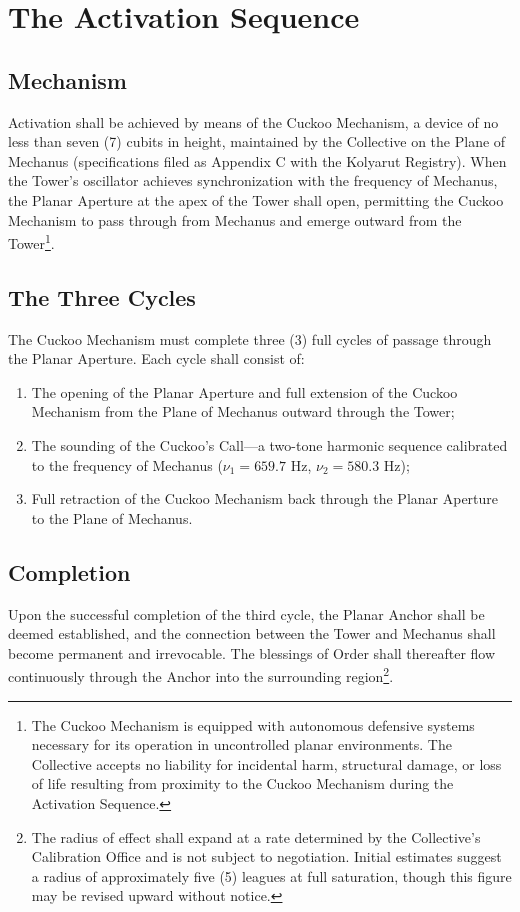\documentclass[12pt]{article}
\begin{document}
\section{The Activation Sequence}

\subsection{Mechanism}
Activation shall be achieved by means of the Cuckoo Mechanism, a
device of no less than seven (7) cubits in height, maintained by the Collective on
the Plane of Mechanus (specifications filed as Appendix C with the
Kolyarut Registry). When the Tower's oscillator achieves synchronization
with the frequency of Mechanus, the Planar Aperture at the apex of
the Tower shall open, permitting the Cuckoo Mechanism to pass through
from Mechanus and emerge outward from the Tower\footnote{The
Cuckoo Mechanism is equipped with autonomous defensive systems
necessary for its operation in uncontrolled planar environments.
The Collective accepts no liability for incidental harm, structural
damage, or loss of life resulting from proximity to the Cuckoo
Mechanism during the Activation Sequence.}.

\subsection{The Three Cycles}
The Cuckoo Mechanism must complete three (3) full cycles of passage
through the Planar Aperture. Each cycle shall consist of:

\begin{enumerate}[label=(\alph*)]
\item The opening of the Planar Aperture and full extension of the
Cuckoo Mechanism from the Plane of Mechanus outward through the Tower;
\item The sounding of the Cuckoo's Call---a two-tone harmonic sequence
calibrated to the frequency of Mechanus ($\nu_1 = 659.7$ Hz,
$\nu_2 = 580.3$ Hz);
\item Full retraction of the Cuckoo Mechanism back through the Planar
Aperture to the Plane of Mechanus.
\end{enumerate}

\subsection{Completion}
Upon the successful completion of the third cycle, the Planar Anchor
shall be deemed established, and the connection between the Tower and
Mechanus shall become permanent and irrevocable. The blessings of
Order shall thereafter flow continuously through the Anchor into the
surrounding region\footnote{The radius of effect shall expand at a
rate determined by the Collective's Calibration Office and is not
subject to negotiation. Initial estimates suggest a radius of
approximately five (5) leagues at full saturation, though this
figure may be revised upward without notice.}.
\end{document}
